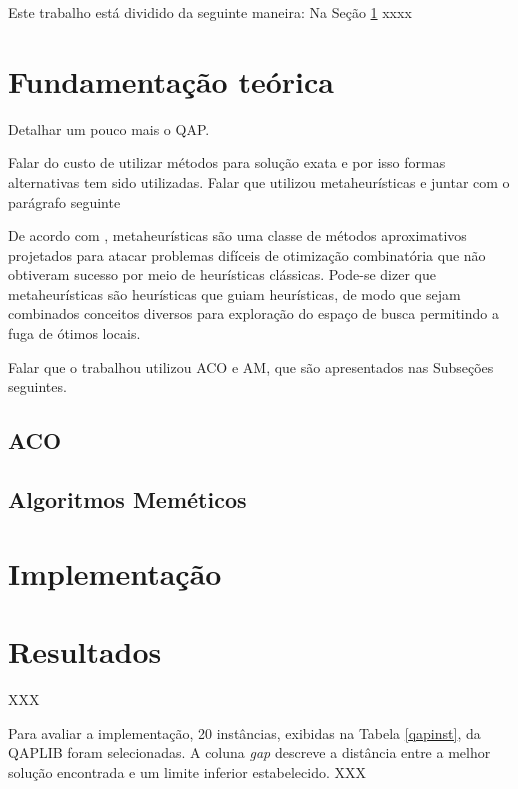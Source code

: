 Este trabalho está dividido da seguinte maneira: Na Seção \ref{sec:fund}
xxxx

\section{Fundamentação teórica}
\label{sec:fund}

Detalhar um pouco mais o QAP.

Falar do custo de utilizar métodos para solução exata e
por isso formas alternativas tem sido utilizadas.
Falar que utilizou metaheurísticas e juntar com o parágrafo seguinte

De acordo com \cite{metatheory}, metaheurísticas são uma
classe de métodos aproximativos projetados para atacar problemas
difíceis de otimização combinatória que não obtiveram sucesso por meio
de heurísticas clássicas. Pode-se dizer que metaheurísticas são
heurísticas que guiam heurísticas, de modo que sejam combinados
conceitos diversos para exploração do espaço de busca permitindo a
fuga de ótimos locais.

Falar que o trabalhou utilizou ACO e AM, que são apresentados nas
Subseções seguintes.

\subsection{ACO}

\subsection{Algoritmos Meméticos}



\section{Implementação}



\section{Resultados}

XXX

Para avaliar a implementação, 20 instâncias, exibidas na Tabela
\ref{qapinst}, da QAPLIB \cite{qaplib} foram selecionadas. A coluna
\textit{gap} descreve a distância entre a melhor solução encontrada e
um limite inferior estabelecido. XXX

